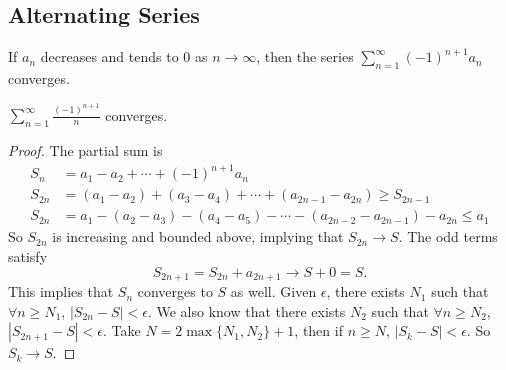 \subsection{Alternating Series}
\leavevmode
\begin{theorem}
    If \(a_n\) decreases and tends to 0 as \(n \to \infty\), then the series \(\sum\limits_{n=1}^{\infty} (-1)^{n+1}a_n\) converges.
\end{theorem}
\begin{example}
    \(\sum\limits_{n=1}^{\infty} \frac{(-1)^{n+1}}{n}\) converges.
\end{example}
\begin{proof}
    The partial sum is
    \begin{align*}
        S_n &= a_1 - a_2 + \cdots + (-1)^{n+1}a_n\\
        S_{2n} &= (a_1 - a_2) + (a_3 - a_4) + \cdots + (a_{2n - 1} - a_{2n}) \geq S_{2n - 1}\\
        S_{2n} &= a_1 - (a_2 - a_3) - (a_4 - a_5) - \cdots - (a_{2n - 2} - a_{2n-1}) - a_{2n} \leq a_1
    \end{align*}
    So \(S_{2n}\) is increasing and bounded above, implying that \(S_{2n}\to S\). The odd terms satisfy
    \[
        S_{2n + 1} = S_{2n} + a_{2n + 1} \to S + 0 = S.
    \]
    This implies that \(S_n\) converges to \(S\) as well. Given \(\epsilon\), there exists \(N_1\) such that \(\forall n \geq N_1\), \(\left\vert S_{2n}-S \right\vert < \epsilon\). We also know that there exists \(N_2\) such that \(\forall n \geq N_2\), \(\left\vert S_{2n + 1} - S \right\vert <\epsilon\). Take \(N = 2 \mathop{\max} \{N_1, N_2\} + 1\), then if \(n \geq N\), \(\left\vert S_k - S\right\vert < \epsilon\). So \(S_k \to S\).
\end{proof}